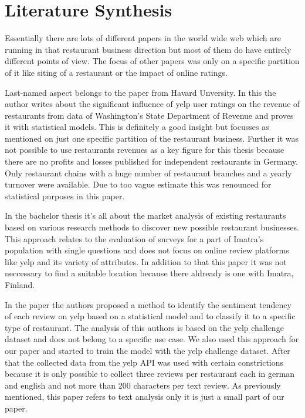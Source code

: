 \section{Literature Synthesis}
\label{sec:synthesis}
Essentially there are lots of different papers in the world wide web which are running in that restaurant business direction but most of them do have entirely different points of view. The focus of other papers was only on a specific partition of it like siting of a restaurant or the impact of online ratings.

Last-named aspect belongs to the paper from Havard Unversity\cite{CaseOfYelp}. In this the author writes about the significant influence of yelp user ratings on the revenue of restaurants from data of Washington’s State Department of Revenue and proves it with statistical models. This is definitely a good insight but focusses as mentioned on just one specific partition of the restaurant business. Further it was not possible to use restaurants revenues as a key figure for this thesis because there are no profits and losses published for independent restaurants in Germany. Only restaurant chains with a huge number of restaurant branches and a yearly turnover were available. Due to too vague estimate this was renounced for statistical purposes in this paper.

In the bachelor thesis \cite{Imatra} it's all about the market analysis of existing restaurants based on various research methods to discover new possible restaurant businesses. This approach relates to the evaluation of surveys for a part of Imatra's population with single questions and does not focus on online review platforms like yelp and its variety of attributes. In addition to that this paper it was not neccessary to find a suitable location because there aldready is one with Imatra, Finland.

In the paper \cite{SentimentAnalysis} the authors proposed a method to identify the sentiment tendency of each review on yelp based on a statistical model and to classify it to a specific type of restaurant. The analysis of this authors is based on the yelp challenge dataset and does not belong to a specific use case. We also used this approach for our paper and started to train the model with the yelp challenge dataset. After that the collected data from the yelp API was used with certain constrictions because it is only possible to collect three reviews per restaurant each in german and english and not more than 200 characters per text review. As previously mentioned, this paper refers to text analysis only it is just a small part of our paper.  
